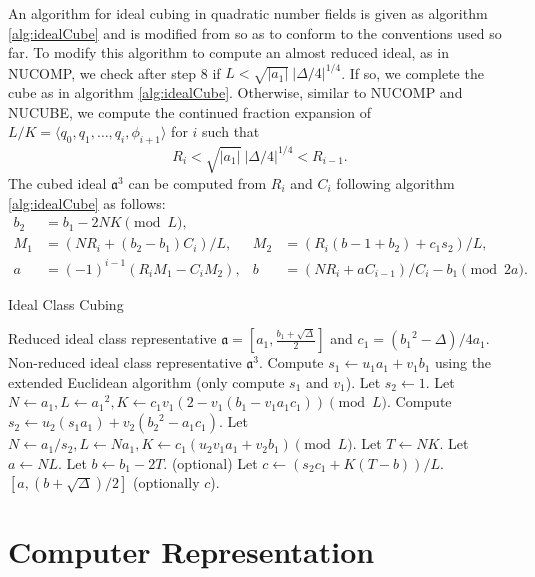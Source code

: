\documentclass{ucalgthes1}
\theoremstyle{plain}
\theoremstyle{definition}
\begin{document}
An algorithm for ideal cubing in quadratic number fields is given as algorithm \ref{alg:idealCube} and is modified from \cite[Appendix A, Algorithm 5]{Ijs2010} so as to conform to the conventions used so far. To modify this algorithm to compute an almost reduced ideal, as in NUCOMP, we check after step 8 if $L < \sqrt{|a_1|} ~ |\Delta/4|^{1/4}$.  If so, we complete the cube as in algorithm \ref{alg:idealCube}.  Otherwise, similar to NUCOMP and NUCUBE, we compute the continued fraction expansion of $L/K = \langle q_0, q_1, \dots, q_i, \phi_{i+1}\rangle$ for $i$ such that
\[
	R_i < \sqrt{|a_1|} ~ |\Delta/4|^{1/4} < R_{i-1}.
\]
The cubed ideal ${\mathfrak a}^3$ can be computed from $R_i$ and $C_i$ following algorithm \ref{alg:idealCube} as follows:
\begin{align*}
	b_2 &= b_1 -2NK \pmod L, & \\
	M_1 &= (NR_i + (b_2-b_1)C_i)/L, &
	M_2 &= (R_i(b-1+b_2)+c_1s_2)/L, \\
	a &= (-1)^{i-1}(R_iM_1-C_iM_2), &
	b &= (NR_i + aC_{i-1})/C_i-b_1 \pmod {2a}.
\end{align*}



\begin{algorithm}[h]
\caption{Ideal Class Cubing}
\label{alg:idealCube}
\begin{algorithmic}[1]
\REQUIRE Reduced ideal class representative $\mathfrak a = \left[a_1, \frac{b_1 + \sqrt\Delta}{2}\right]$ and $c_1 = ({b_1}^2-\Delta)/4a_1$.
\ENSURE Non-reduced ideal class representative ${\mathfrak a}^3$.
\STATE Compute $s_1 \leftarrow u_1a_1 + v_1b_1$ using the extended Euclidean algorithm (only compute $s_1$ and $v_1$).
	\STATE Let $s_2 \leftarrow 1$.
	\STATE Let $N \leftarrow a_1, L \leftarrow {a_1}^2, K \leftarrow c_1v_1(2-v_1(b_1-v_1a_1c_1)) \pmod L$.
\ELSE
	\STATE Compute $s_2 \leftarrow u_2(s_1a_1) + v_2({b_2}^2-a_1c_1)$.
	\STATE Let $N \leftarrow a_1/s_2, L \leftarrow Na_1, K \leftarrow c_1(u_2v_1a_1+v_2b_1) \pmod L$.
\ENDIF
\STATE Let $T \leftarrow NK$.
\STATE Let $a \leftarrow NL$.
\STATE Let $b \leftarrow b_1 - 2T$.
\STATE (optional) Let $c \leftarrow (s_2c_1+K(T-b))/L$.
\RETURN $[a, (b+\sqrt\Delta)/2]$ (optionally $c$).
\end{algorithmic}
\end{algorithm}



\bigbreak
\section{Computer Representation}
\label{section:computerRepresentation}
\end{document}
